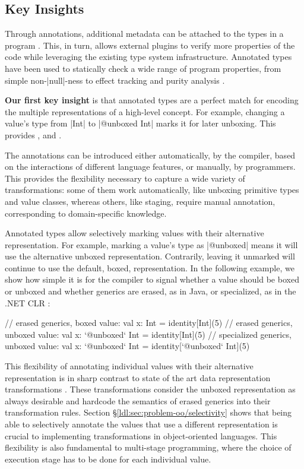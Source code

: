 \subsection*{Key Insights}

Through annotations, additional metadata can be attached to the types in a program \cite{sip-annotations, jsr-annotations}. This, in turn, allows external plugins to verify more properties of the code while leveraging the existing type system infrastructure. Annotated types have been used to statically check a wide range of program properties, from simple non-|null|-ness to effect tracking and purity analysis \cite{papi-annot-typechecker, lukas-thesis}.

\textbf{Our first key insight} is that annotated types are a perfect match for encoding the multiple representations of a high-level concept. For example, changing a value's type from |Int| to |@unboxed Int| marks it for later unboxing. This provides ,  and .

 The annotations can be introduced either automatically, by the compiler, based on the interactions of different language features, or manually, by programmers. This provides the flexibility necessary to capture a wide variety of transformations: some of them work automatically, like unboxing primitive types and value classes, whereas others, like staging, require manual annotation, corresponding to domain-specific knowledge.

 Annotated types allow selectively marking values with their alternative representation. For example, marking a value's type as |@unboxed| means it will use the alternative unboxed representation. Contrarily, leaving it unmarked will continue to use the default, boxed, representation. In the following example, we show how simple it is for the compiler to signal whether a value should be boxed or unboxed and whether generics are erased, as in Java, or specialized, as in the .NET CLR \cite{dot-net-generics, ecma-dotnet}:

\begin{lstlisting-nobreak}
 // erased generics, boxed value:
 val x: Int = identity[Int](5)
 // erased generics, unboxed value:
 val x: `@unboxed` Int = identity[Int](5)
 // specialized generics, unboxed value:
 val x: `@unboxed` Int = identity[`@unboxed` Int](5)
\end{lstlisting-nobreak}

This flexibility of annotating individual values with their alternative representation is in sharp contrast to state of the art data representation transformations \cite{leroy-unboxed-objects, java-erasure}. These transformations consider the unboxed representation as always desirable and hardcode the semantics of erased generics into their transformation rules. Section \S\ref{ldl:sec:problem-oo/selectivity} shows that being able to selectively annotate the values that use a different representation is crucial to implementing transformations in object-oriented languages. This flexibility is also fundamental to multi-stage programming, where the choice of execution stage has to be done for each individual value.

